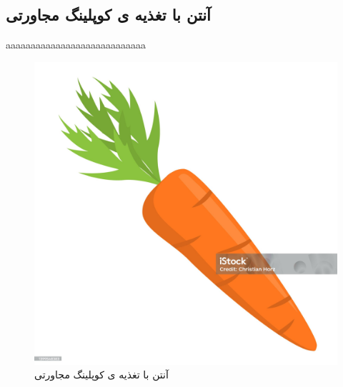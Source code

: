 \subsection{آنتن با تغذیه ی کوپلینگ مجاورتی}
aaaaaaaaaaaaaaaaaaaaaaaaaaaa
\begin{figure}
	\centering
	\includegraphics[scale=0.3]{Images/aaa.jpg}
	\caption{آنتن با تغذیه ی کوپلینگ مجاورتی}
	\label{fig5}
\end{figure}

